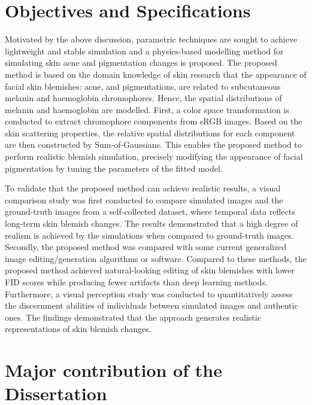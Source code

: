 \begin{spacing}{1.5}
\section{Objectives and Specifications}

Motivated by the above discussion, parametric techniques are sought to achieve lightweight and stable simulation and a physics-based modelling method for simulating skin acne and pigmentation changes is proposed. The proposed method is based on the domain knowledge of skin research that the appearance of facial skin blemishes: acne, and pigmentations, are related to subcutaneous melanin and haemoglobin chromophores. Hence, the spatial distributions of melanin and haemoglobin are modelled. First, a color space transformation is conducted to extract chromophore components from sRGB images. Based on the skin scattering properties, the relative spatial distributions for each component are then constructed by Sum-of-Gaussians. This enables the proposed method to perform realistic blemish simulation, precisely modifying the appearance of facial pigmentation by tuning the parameters of the fitted model.

To validate that the proposed method can achieve realistic results, a visual comparison study was first conducted to compare simulated images and the ground-truth images from a self-collected dataset, where temporal data reflects long-term skin blemish changes. The results demonstrated that a high degree of realism is achieved by the simulations when compared to ground-truth images. Secondly, the proposed method was compared with some current generalized image editing/generation algorithms or software. Compared to these methods, the proposed method achieved natural-looking editing of skin blemishes with lower FID scores while producing fewer artifacts than deep learning methods. Furthermore, a visual perception study was conducted to quantitatively assess the discernment abilities of individuals between simulated images and authentic ones. The findings demonstrated that the approach generates realistic representations of skin blemish changes.


\section{Major contribution of the Dissertation}


\end{spacing}
